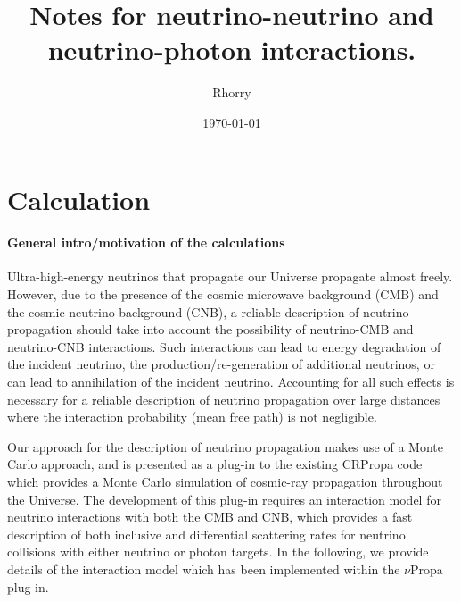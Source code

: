 \documentclass[a4paper,11pt]{article}
\begin{document}
\title{Notes for neutrino-neutrino and neutrino-photon interactions.}

\author[1]{Rhorry}

\date{\today}


\maketitle
\flushbottom

\section{Calculation}


\paragraph{General intro/motivation of the calculations}

Ultra-high-energy neutrinos that propagate our Universe propagate almost freely.
However, due to the presence of the cosmic microwave background (CMB) and the cosmic neutrino background (CNB), a reliable description of neutrino propagation should take into account the possibility of neutrino-CMB and neutrino-CNB interactions.
Such interactions can lead to energy degradation of the incident neutrino, the production/re-generation of additional neutrinos, or can lead to annihilation of the incident neutrino.
Accounting for all such effects is necessary for a reliable description of neutrino propagation over large distances where the interaction probability (mean free path) is not negligible.

Our approach for the description of neutrino propagation makes use of a Monte Carlo approach, and is presented as a plug-in to the existing CRPropa code which provides a Monte Carlo simulation of cosmic-ray propagation throughout the Universe.
The development of this plug-in requires an interaction model for neutrino interactions with both the CMB and CNB, which provides a fast description of both inclusive and differential scattering rates for neutrino collisions with either neutrino or photon targets.
In the following, we provide details of the interaction model which has been implemented within the $\nu$Propa plug-in.
\end{document}
